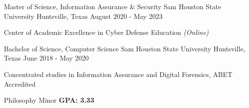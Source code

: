 \begin{cventries}

  \cventry
	{Master of Science, Information Assurance \& Security} %
	{Sam Houston State University} %
	{Huntsville, Texas} %
	{August 2020 - May 2023} %
	{
    \begin{cvitems}
      \item {Center of Academic Excellence in Cyber Defense Education \hfill \textit{(Online)}}
    \end{cvitems}
  }
  \cventry
    {Bachelor of Science, Computer Science} %
    {Sam Houston State University} %
    {Huntsville, Texas} %
    {June 2018 - May 2020} %
    {
      \begin{cvitems} %
        \item{Concentrated studies in Information Assurance and Digital Forensics, ABET Accredited}
        \item{Philosophy Minor \hfill \textbf{GPA: 3.33}}        
      \end{cvitems}
    }
\end{cventries}
